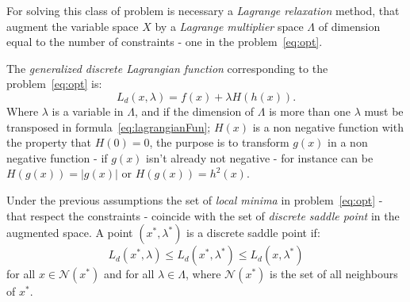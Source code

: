 \documentclass[a4paper]{article}
\begin{document}
For solving this class
of problem is necessary a \emph{Lagrange relaxation} method, that
augment the variable space $X$ by a \emph{Lagrange multiplier} space
$\Lambda$ of dimension equal to the number of constraints - one in the
problem~\eqref{eq:opt}.

The \emph{generalized discrete Lagrangian
  function} corresponding to the problem~\eqref{eq:opt} is:
\begin{equation}\label{eq:lagrangianFun}
  L_d(x,\lambda)=f(x)+\lambda H(h(x)).
\end{equation}
Where $\lambda$ is a variable in $\Lambda$, and if the dimension of
$\Lambda$ is more than one $\lambda$ must be transposed in
formula~\eqref{eq:lagrangianFun}; $H(x)$ is a non negative function
with the property that $H(0)=0$, the purpose is to transform $g(x)$ in
a non negative function - if $g(x)$ isn't already not negative - for
instance can be $H(g(x))=|g(x)|$ or $H(g(x))=h^2(x)$.

Under the previous assumptions the set of \emph{local minima}
in problem~\eqref{eq:opt} - that respect the constraints -  coincide
with the set of \emph{discrete saddle point}
in the augmented space. A point $(x^*,\lambda^*)$ is a discrete saddle
point if:
\begin{equation*}
  L_d(x^*,\lambda)\leq L_d(x^*,\lambda^*)\leq L_d(x,\lambda^*)
\end{equation*}
for all $x\in\mathcal{N}(x^*)$ and for all $\lambda\in\Lambda$, where
$\mathcal{N}(x^*)$ is the set of all neighbours of $x^*$.
\end{document}
